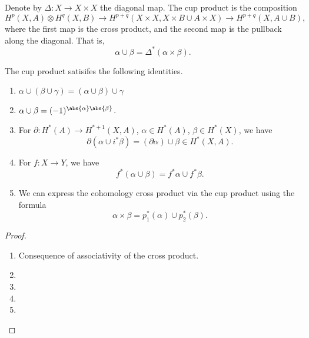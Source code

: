 \documentclass[main.tex]{subfiles}
\begin{document}
\begin{definition}
  \label{def:cup_product}
  Denote by \(\Delta\colon X \to X \times X\) the diagonal map. The cup product is the composition
  \begin{equation*}
    H^{p}(X, A) \otimes H^{q}(X, B) \to H^{p+q}(X \times X, X \times B \cup A \times X) \to H^{p+q}(X, A \cup B),
  \end{equation*}
  where the first map is the cross product, and the second map is the pullback along the diagonal. That is,
  \begin{equation*}
    \alpha \cup \beta = \Delta^{*}(\alpha \times \beta).
  \end{equation*}
\end{definition}

\begin{proposition}
  The cup product satisifes the following identities.
  \begin{enumerate}
    \item \(\alpha \cup (\beta \cup \gamma) = (\alpha \cup \beta) \cup \gamma\)

    \item \(\alpha \cup \beta = (-1)^{\abs{\alpha}\abs{\beta}}\).

    \item For \(\partial\colon H^{*}(A) \to H^{*+1}(X, A)\), \(\alpha \in H^{*}(A)\), \(\beta \in H^{*}(X)\), we have
      \begin{equation*}
        \partial(\alpha \cup i^{*}\beta) = (\partial \alpha) \cup \beta \in H^{*}(X, A).
      \end{equation*}

    \item For \(f\colon X \to Y\), we have
      \begin{equation*}
        f^{*}(\alpha \cup \beta) = f^{*}\alpha \cup f^{*}\beta.
      \end{equation*}

    \item We can express the cohomology cross product via the cup product using the formula
      \begin{equation*}
        \alpha \times \beta = p_{1}^{*}(\alpha) \cup p_{2}^{*}(\beta).
      \end{equation*}
  \end{enumerate}
\end{proposition}
\begin{proof}
  \leavevmode
  \begin{enumerate}
    \item Consequence of associativity of the cross product.

    \item

    \item

    \item

    \item
  \end{enumerate}
\end{proof}
\end{document}
